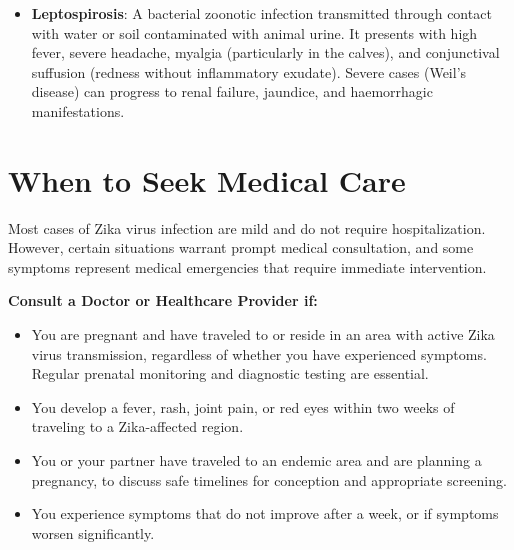 \begin{itemize}
    \item \textbf{Leptospirosis}: A bacterial zoonotic infection transmitted through contact with water or soil contaminated with animal urine. It presents with high fever, severe headache, myalgia (particularly in the calves), and conjunctival suffusion (redness without inflammatory exudate). Severe cases (Weil's disease) can progress to renal failure, jaundice, and haemorrhagic manifestations.
\end{itemize}

\section*{When to Seek Medical Care}
Most cases of Zika virus infection are mild and do not require hospitalization. However, certain situations warrant prompt medical consultation, and some symptoms represent medical emergencies that require immediate intervention.

\textbf{Consult a Doctor or Healthcare Provider if:}
\begin{itemize}
    \item You are pregnant and have traveled to or reside in an area with active Zika virus transmission, regardless of whether you have experienced symptoms. Regular prenatal monitoring and diagnostic testing are essential.
    \item You develop a fever, rash, joint pain, or red eyes within two weeks of traveling to a Zika-affected region.
    \item You or your partner have traveled to an endemic area and are planning a pregnancy, to discuss safe timelines for conception and appropriate screening.
    \item You experience symptoms that do not improve after a week, or if symptoms worsen significantly.
\end{itemize}

